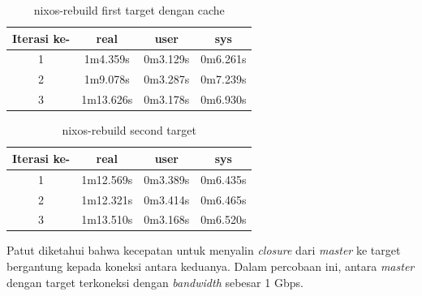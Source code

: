 \documentclass[10pt,twoside]{report}
\begin{document}
\begin{adjustwidth}{20pt}{}
\begin{adjustwidth}{20pt}{}
		\begin{table}[H]
			\caption{nixos-rebuild first target dengan cache}
			\begin{center}
				\begin{tabular}[c]{|c|c|c|c|}
					\hline
					\multicolumn{1}{|c|}{\textbf{Iterasi ke-}} &
					\multicolumn{1}{c|}{\textbf{real}}         &
					\multicolumn{1}{c|}{\textbf{user}}         &
					\multicolumn{1}{c|}{\textbf{sys}}                                            \\
					\hline
					1                                          & 1m4.359s  & 0m3.129s & 0m6.261s \\
					\hline
					2                                          & 1m9.078s  & 0m3.287s & 0m7.239s \\
					\hline
					3                                          & 1m13.626s & 0m3.178s & 0m6.930s \\
					\hline
				\end{tabular}
			\end{center}
		\end{table}
		\vspace{-5mm}
		\begin{table}[H]
			\caption{nixos-rebuild second target}
			\begin{center}
				\begin{tabular}[c]{|c|c|c|c|}
					\hline
					\multicolumn{1}{|c|}{\textbf{Iterasi ke-}} &
					\multicolumn{1}{c|}{\textbf{real}}         &
					\multicolumn{1}{c|}{\textbf{user}}         &
					\multicolumn{1}{c|}{\textbf{sys}}                                            \\
					\hline
					1                                          & 1m12.569s & 0m3.389s & 0m6.435s \\
					\hline
					2                                          & 1m12.321s & 0m3.414s & 0m6.465s \\
					\hline
					3                                          & 1m13.510s & 0m3.168s & 0m6.520s \\
					\hline
				\end{tabular}
			\end{center}
		\end{table}
		Patut diketahui bahwa kecepatan untuk menyalin \textit{closure} dari \textit{master}
		ke target bergantung kepada koneksi antara keduanya. Dalam percobaan ini,
		antara \textit{master} dengan target terkoneksi dengan \textit{bandwidth} sebesar
		1 Gbps.
	\end{adjustwidth}

\end{adjustwidth}
\end{document}
